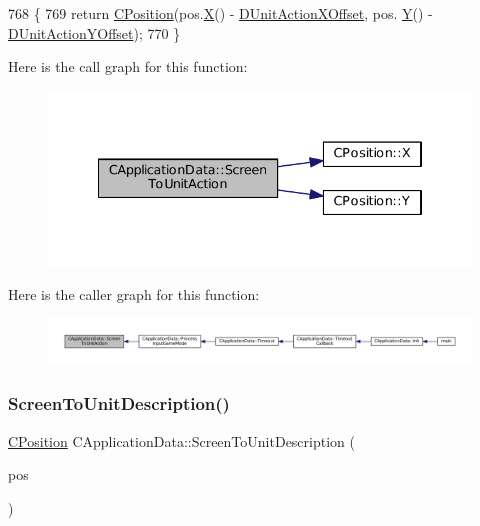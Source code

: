\begin{DoxyCode}
768                                                                   \{
769     \textcolor{keywordflow}{return} \hyperlink{classCPosition}{CPosition}(pos.\hyperlink{classCPosition_a9a6b94d3b91df1492d166d9964c865fc}{X}() - \hyperlink{classCApplicationData_aa47b53d283617575a4866c08d83e27c4}{DUnitActionXOffset}, pos.
      \hyperlink{classCPosition_a1aa8a30e2f08dda1f797736ba8c13a87}{Y}() - \hyperlink{classCApplicationData_a8ccfb55bd25cba0e6eb66573ba9c8b3c}{DUnitActionYOffset});
770 \}
\end{DoxyCode}
Here is the call graph for this function\+:\nopagebreak
\begin{figure}[H]
\begin{center}
\leavevmode
\includegraphics[width=334pt]{classCApplicationData_a2d956280cfd6074f56db3753c7467248_cgraph}
\end{center}
\end{figure}
Here is the caller graph for this function\+:\nopagebreak
\begin{figure}[H]
\begin{center}
\leavevmode
\includegraphics[width=350pt]{classCApplicationData_a2d956280cfd6074f56db3753c7467248_icgraph}
\end{center}
\end{figure}
\hypertarget{classCApplicationData_a5400b710281ac2671d8d76aa442124ec}{}\label{classCApplicationData_a5400b710281ac2671d8d76aa442124ec} 
\subsubsection{\texorpdfstring{Screen\+To\+Unit\+Description()}{ScreenToUnitDescription()}}
{\footnotesize\ttfamily \hyperlink{classCPosition}{C\+Position} C\+Application\+Data\+::\+Screen\+To\+Unit\+Description (\begin{DoxyParamCaption}\item[{const \hyperlink{classCPosition}{C\+Position} \&}]{pos }\end{DoxyParamCaption})\hspace{0.3cm}{\ttfamily [protected]}}



